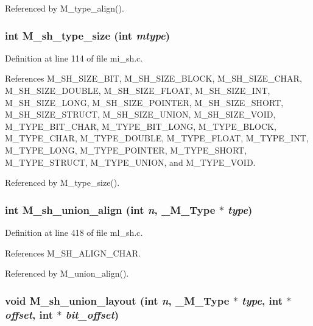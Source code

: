 Referenced by M\_\-type\_\-align().
\subsubsection{\setlength{\rightskip}{0pt plus 5cm}int M\_\-sh\_\-type\_\-size (int {\em mtype})}\label{m__sh_8h_8e8abdcec626b5032f0139743cba5d97}




Definition at line 114 of file mi\_\-sh.c.

References M\_\-SH\_\-SIZE\_\-BIT, M\_\-SH\_\-SIZE\_\-BLOCK, M\_\-SH\_\-SIZE\_\-CHAR, M\_\-SH\_\-SIZE\_\-DOUBLE, M\_\-SH\_\-SIZE\_\-FLOAT, M\_\-SH\_\-SIZE\_\-INT, M\_\-SH\_\-SIZE\_\-LONG, M\_\-SH\_\-SIZE\_\-POINTER, M\_\-SH\_\-SIZE\_\-SHORT, M\_\-SH\_\-SIZE\_\-STRUCT, M\_\-SH\_\-SIZE\_\-UNION, M\_\-SH\_\-SIZE\_\-VOID, M\_\-TYPE\_\-BIT\_\-CHAR, M\_\-TYPE\_\-BIT\_\-LONG, M\_\-TYPE\_\-BLOCK, M\_\-TYPE\_\-CHAR, M\_\-TYPE\_\-DOUBLE, M\_\-TYPE\_\-FLOAT, M\_\-TYPE\_\-INT, M\_\-TYPE\_\-LONG, M\_\-TYPE\_\-POINTER, M\_\-TYPE\_\-SHORT, M\_\-TYPE\_\-STRUCT, M\_\-TYPE\_\-UNION, and M\_\-TYPE\_\-VOID.

Referenced by M\_\-type\_\-size().
\subsubsection{\setlength{\rightskip}{0pt plus 5cm}int M\_\-sh\_\-union\_\-align (int {\em n}, \bf{\_\-M\_\-Type} $\ast$ {\em type})}\label{m__sh_8h_0aaef67e02f1053679530eb4adbe0a84}




Definition at line 418 of file ml\_\-sh.c.

References M\_\-SH\_\-ALIGN\_\-CHAR.

Referenced by M\_\-union\_\-align().
\subsubsection{\setlength{\rightskip}{0pt plus 5cm}void M\_\-sh\_\-union\_\-layout (int {\em n}, \bf{\_\-M\_\-Type} $\ast$ {\em type}, int $\ast$ {\em offset}, int $\ast$ {\em bit\_\-offset})}\label{m__sh_8h_fb401d4a3045cb87e02bbe2f7f50f928}




